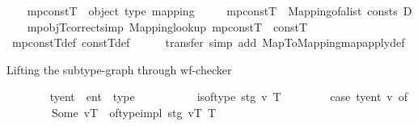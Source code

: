 \begin{isabellebody}
\ \ \isamarkupfalse%
\ mp{\isacharunderscore}{\kern0pt}constT\ {\isacharcolon}{\kern0pt}{\isacharcolon}{\kern0pt}\ {\isachardoublequoteopen}{\isacharparenleft}{\kern0pt}object{\isacharcomma}{\kern0pt}\ type{\isacharparenright}{\kern0pt}\ mapping{\isachardoublequoteclose}\ \isanewline
\ \ \ \ {\isachardoublequoteopen}mp{\isacharunderscore}{\kern0pt}constT\ {\isacharequal}{\kern0pt}\ Mapping{\isachardot}{\kern0pt}of{\isacharunderscore}{\kern0pt}alist\ {\isacharparenleft}{\kern0pt}consts\ D{\isacharparenright}{\kern0pt}{\isachardoublequoteclose}\isanewline
\isanewline
\ \ \isamarkupfalse%
\ mp{\isacharunderscore}{\kern0pt}objT{\isacharunderscore}{\kern0pt}correct{\isacharbrackleft}{\kern0pt}simp{\isacharbrackright}{\kern0pt}{\isacharcolon}{\kern0pt}\ {\isachardoublequoteopen}Mapping{\isachardot}{\kern0pt}lookup\ mp{\isacharunderscore}{\kern0pt}constT\ {\isacharequal}{\kern0pt}\ constT{\isachardoublequoteclose}\isanewline
%
\isadelimproof
\ \ \ \ %
\endisadelimproof
%
\isatagproof
{}\isamarkupfalse%
\ mp{\isacharunderscore}{\kern0pt}constT{\isacharunderscore}{\kern0pt}def\ constT{\isacharunderscore}{\kern0pt}def\isanewline
\ \ \ \ \isamarkupfalse%
\ transfer\ {\isacharparenleft}{\kern0pt}simp\ add{\isacharcolon}{\kern0pt}\ Map{\isacharunderscore}{\kern0pt}To{\isacharunderscore}{\kern0pt}Mapping{\isachardot}{\kern0pt}map{\isacharunderscore}{\kern0pt}apply{\isacharunderscore}{\kern0pt}def{\isacharparenright}{\kern0pt}%
\endisatagproof
{\isafoldproof}%
%
\isadelimproof
%
\endisadelimproof
%
\begin{isamarkuptext}%
Lifting the subtype-graph through wf-checker%
\end{isamarkuptext}\isamarkuptrue%
\ \ \isamarkupfalse%
\isanewline
\ \ \ \ \ ty{\isacharunderscore}{\kern0pt}ent\ {\isacharcolon}{\kern0pt}{\isacharcolon}{\kern0pt}\ {\isachardoublequoteopen}{\isacharprime}{\kern0pt}ent\ {\isasymrightharpoonup}\ type{\isachardoublequoteclose}\ \ %
\isanewline
\ \ \isanewline
\isanewline
\ \ \ \ \isamarkupfalse%
\ {\isachardoublequoteopen}is{\isacharunderscore}{\kern0pt}of{\isacharunderscore}{\kern0pt}type{\isacharprime}{\kern0pt}\ stg\ v\ T\ {\isasymlongleftrightarrow}\ {\isacharparenleft}{\kern0pt}\isanewline
\ \ \ \ \ \ case\ ty{\isacharunderscore}{\kern0pt}ent\ v\ of\isanewline
\ \ \ \ \ \ \ \ Some\ vT\ {\isasymRightarrow}\ of{\isacharunderscore}{\kern0pt}type{\isacharunderscore}{\kern0pt}impl\ stg\ vT\ T\isanewline

\end{isabellebody}
